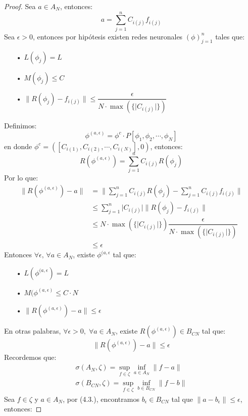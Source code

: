 \documentclass[12pt,a4paper]{book}
\providecommand{\abs}[1]{\lvert#1\rvert}
\providecommand{\norm}[1]{\lVert#1\rVert}
\providecommand{\conj}[1]{\lbrace#1\rbrace}
\begin{document}
\begin{proof}
Sea $a\in A_{N}$, entonces: $$a=\sum_{j=1}^{n}C_{i(j)}f_{i(j)}$$
Sea $\epsilon >0$, entonces por hipótesis existen redes neuronales $(\phi)_{j=1}^{n}$ tales que:
\begin{enumerate}
\item[•] $L(\phi_{j})=L$
\item[•] $M(\phi_{j})\leq C$
\item[•] $\norm{R(\phi_{j})-f_{i(j)}}\leq \dfrac{\epsilon}{N\cdot\max(\conj{\abs{C_{i(j)}}})}$
\end{enumerate}
Definimos: $$\phi^{(a,\epsilon)}=\phi^{c}\cdot P[\phi_{1},\phi_{2},\cdots,\phi_{N}]$$
en donde $\phi^{c}=([C_{i(1)},C_{i(2)},\cdots,C_{i(N)}],0)$, entonces: $$R(\phi^{(a,\epsilon)})=\sum_{j=1}^{n}C_{i(j)}R(\phi_{j})$$
Por lo que:
\begin{equation*}
\begin{split}
\norm{R(\phi^{(a,\epsilon)})-a} &= \norm{\sum_{j=1}^{n}C_{i(j)}R(\phi_{j})-\sum_{j=1}^{n}C_{i(j)}f_{i(j)}}\\&
\leq  \sum_{j=1}^{n}\abs{C_{i(j)}}\norm{R(\phi_{j})-f_{i(j)}}\\&
\leq N\cdot\max(\conj{\abs{C_{i(j)}}})\dfrac{\epsilon}{N\cdot\max(\conj{\abs{C_{i(j)}}})}\\&
\leq\epsilon
\end{split}
\end{equation*}
Entonces $\forall\epsilon,\,\forall a\in A_{N}$, existe $\phi^{(a,\epsilon}$ tal que:
\begin{enumerate}
\item[•] $L(\phi^{(a,\epsilon})=L$
\item[•] $M(\phi^{(a,\epsilon)}\leq C\cdot N$
\item[•] $\norm{R(\phi^{(a,\epsilon)})-a}\leq\epsilon$
\end{enumerate}
En otras palabras, $\forall\epsilon >0,\;\forall a\in A_{N}$, existe $R(\phi^{(a,\epsilon)})\in B_{CN}$ tal que:
\begin{equation}
\norm{R(\phi^{(a,\epsilon)})-a}\leq\epsilon
\end{equation}
Recordemos que:
\begin{equation*}
\begin{split}
\sigma(A_{N},\zeta)=\sup_{f\in\zeta}\inf_{a\in A_{N}}\norm{f-a}\\
\sigma(B_{CN},\zeta)=\sup_{f\in\zeta}\inf_{b\in B_{CN}}\norm{f-b}
\end{split}
\end{equation*}
Sea $f\in\zeta$ y $a\in A_{N}$, por (4.3.), encontramos $b_{\epsilon}\in B_{CN}$ tal que $\norm{a-b_{\epsilon}}\leq \epsilon$, entonces:

\end{proof}
\end{document}
